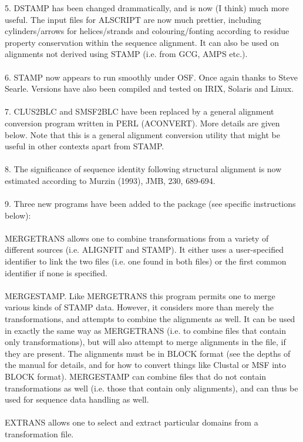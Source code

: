 5. DSTAMP has been changed drammatically, and is now (I think) much more useful.  The
input files for ALSCRIPT are now much prettier, including cylinders/arrows for helices/strands 
and colouring/fonting according to residue property conservation within the sequence alignment.
It can also be used on alignments not derived using STAMP (i.e. from GCG, AMPS etc.).\\
\\
6. STAMP now appears to run smoothly under OSF.  Once again thanks to Steve Searle.  Versions
have also been compiled and tested on IRIX, Solaris and Linux.\\
\\
7. CLUS2BLC and SMSF2BLC have been replaced by a general alignment conversion program written
in PERL (ACONVERT).  More details are given below.  Note that this is a general alignment
conversion utility that might be useful in other contexts apart from STAMP.\\
\\
8. The significance of sequence identity following structural alignment is now estimated 
according to Murzin (1993), JMB, 230, 689-694.\\
\\
9. Three new programs have been added to the package (see specific instructions below):\\
\\
MERGETRANS allows one to combine transformations from a variety of different 
sources (i.e. ALIGNFIT and STAMP).  It either uses a user-specified identifier to link the 
two files (i.e. one found in both files) or the first common identifier if none is specified.\\
\\
MERGESTAMP.  Like MERGETRANS this program permits one to merge
various kinds of STAMP data.  However, it considers more than merely
the transformations, and attempts to combine the alignments as well.
It can be used in exactly the same way as MERGETRANS (i.e. to combine
files that contain only transformations), but will also attempt to merge
alignments in the file, if they are present.  The alignments must be
in BLOCK format (see the depths of the manual for details, and for how
to convert things like Clustal or MSF into BLOCK format).  MERGESTAMP
can combine files that do not contain transformations as well (i.e. those
that contain only alignments), and can thus be used for sequence data
handling as well.\\
\\
EXTRANS allows one to select and extract particular domains from a transformation file. 


